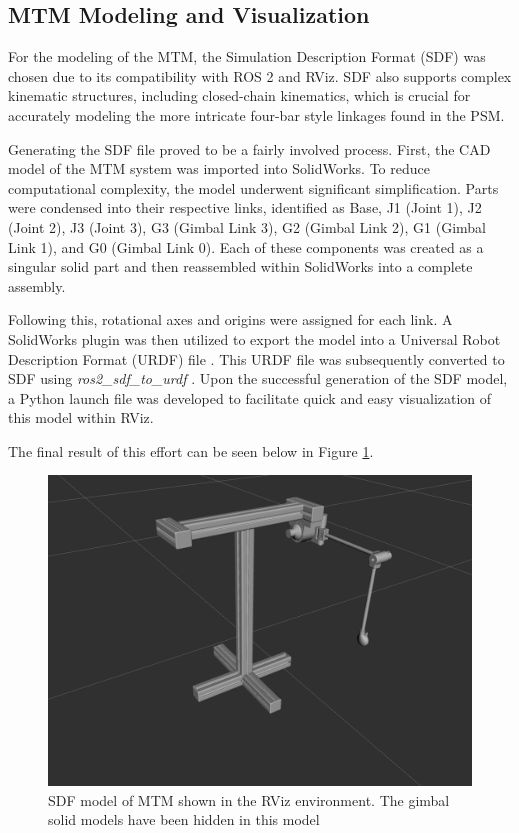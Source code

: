 \subsection{MTM Modeling and Visualization}

For the modeling of the MTM, the Simulation Description Format (SDF) was chosen due to its compatibility with ROS 2 and RViz. SDF also supports complex kinematic structures, including closed-chain kinematics, which is crucial for accurately modeling the more intricate four-bar style linkages found in the PSM.

Generating the SDF file proved to be a fairly involved process. First, the CAD model of the MTM system was imported into SolidWorks. To reduce computational complexity, the model underwent significant simplification. Parts were condensed into their respective links, identified as Base, J1 (Joint 1), J2 (Joint 2), J3 (Joint 3), G3 (Gimbal Link 3), G2 (Gimbal Link 2), G1 (Gimbal Link 1), and G0 (Gimbal Link 0).
Each of these components was created as a singular solid part and then reassembled within SolidWorks into a complete assembly.

Following this, rotational axes and origins were assigned for each link. A SolidWorks plugin was then utilized to export the model into a Universal Robot Description Format (URDF) file \cite{ROS:SWURDFExporter}. This URDF file was subsequently converted to SDF using \textit{ros2\_sdf\_to\_urdf} \cite{BruceChanJianLe:igngzu_urdf_to_sdf}. Upon the successful generation of the SDF model, a Python launch file was developed to facilitate quick and easy visualization of this model within RViz.

The final result of this effort can be seen below in Figure \ref{fig:mtm_sdf_model}.

\begin{figure}[H]
    \centering
    \includegraphics[width=0.9\linewidth]{figures/mtm_sdf_model.png}
    \caption{SDF model of MTM shown in the RViz environment. The gimbal solid models have been hidden in this model}
    \label{fig:mtm_sdf_model}
\end{figure}

